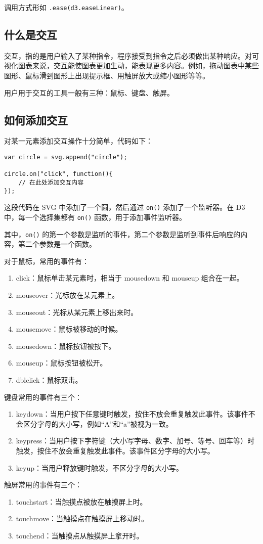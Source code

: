 调用方式形如 \verb|.ease(d3.easeLinear)|。

\subsection{什么是交互}

交互，指的是用户输入了某种指令，程序接受到指令之后必须做出某种响应。对可视化图表来说，交互能使图表更加生动，能表现更多内容。例如，拖动图表中某些图形、鼠标滑到图形上出现提示框、用触屏放大或缩小图形等等。

用户用于交互的工具一般有三种：鼠标、键盘、触屏。

\subsection{如何添加交互}

对某一元素添加交互操作十分简单，代码如下：

\begin{verbatim}
var circle = svg.append("circle");

circle.on("click", function(){
    // 在此处添加交互内容
});
\end{verbatim}

这段代码在 SVG 中添加了一个圆，然后通过 \verb|on()| 添加了一个监听器。在 D3 中，每一个选择集都有 \verb|on()| 函数，用于添加事件监听器。

其中，\verb|on()| 的第一个参数是监听的事件，第二个参数是监听到事件后响应的内容，第二个参数是一个函数。

对于鼠标，常用的事件有：

\begin{enumerate}
    \item click：鼠标单击某元素时，相当于 mousedown 和 mouseup 组合在一起。
    \item mouseover：光标放在某元素上。
    \item mouseout：光标从某元素上移出来时。
    \item mousemove：鼠标被移动的时候。
    \item mousedown：鼠标按钮被按下。
    \item mouseup：鼠标按钮被松开。
    \item dblclick：鼠标双击。
\end{enumerate}

键盘常用的事件有三个：

\begin{enumerate}
    \item keydown：当用户按下任意键时触发，按住不放会重复触发此事件。该事件不会区分字母的大小写，例如“A”和“a”被视为一致。
    \item keypress：当用户按下字符键（大小写字母、数字、加号、等号、回车等）时触发，按住不放会重复触发此事件。该事件区分字母的大小写。
    \item keyup：当用户释放键时触发，不区分字母的大小写。
\end{enumerate}

触屏常用的事件有三个：

\begin{enumerate}
    \item touchstart：当触摸点被放在触摸屏上时。
    \item touchmove：当触摸点在触摸屏上移动时。
    \item touchend：当触摸点从触摸屏上拿开时。
\end{enumerate}
